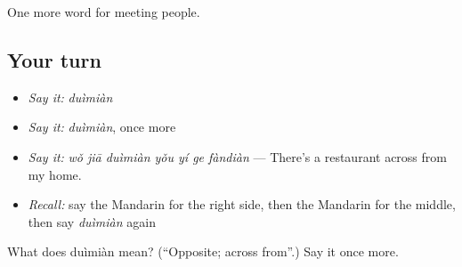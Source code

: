 \begin{grammarlens}[title={What you've built}]
One more word for meeting people.
\end{grammarlens}

\subsection*{Your turn}
\begin{itemize}
\raggedright
  \item \emph{Say it:} \emph{duìmiàn}
  \item \emph{Say it:} \emph{duìmiàn}, once more
  \item \emph{Say it:} \emph{wǒ jiā duìmiàn yǒu yí ge fàndiàn} — There's a restaurant across from my home.
  \item \emph{Recall:} say the Mandarin for the right side, then the Mandarin for the middle, then say \emph{duìmiàn} again
\end{itemize}

\begin{tcolorbox}[breakable,colback=teal!4,colframe=teal!35!black,title={Before you move on}]
What does duìmiàn mean? (\textquotedblleft{}Opposite; across from\textquotedblright{}.) Say it once more.
\end{tcolorbox}

